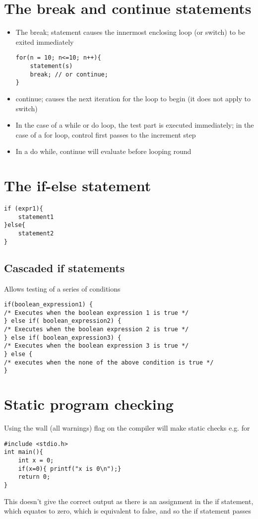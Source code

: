 \documentclass{article}[18pt]
\begin{document}
\section{The break and continue statements}
\begin{itemize}
	\item The break; statement causes the innermost enclosing loop (or switch) to be exited immediately
\begin{verbatim}
for(n = 10; n<=10; n++){
	statement(s)
	break; // or continue;
}
\end{verbatim}
	\item continue; causes the next iteration for the loop to begin (it does not apply to switch)
	\item In the case of a while or do loop, the test part is executed immediately; in the case of a for loop, control first passes to the increment step
	\item In a do while, continue will evaluate before looping round
\end{itemize}
\section{The if-else statement}
\begin{verbatim}
if (expr1){
	statement1
}else{
	statement2
}
\end{verbatim}
\subsection{Cascaded if statements}
Allows testing of a series of conditions
\begin{verbatim}
if(boolean_expression1) {
/* Executes when the boolean expression 1 is true */
} else if( boolean_expression2) {
/* Executes when the boolean expression 2 is true */
} else if( boolean_expression3) {
/* Executes when the boolean expression 3 is true */
} else {
/* executes when the none of the above condition is true */
}
\end{verbatim}
\section{Static program checking}
Using the wall (all warnings) flag on the compiler will make static checks e.g. for
\begin{verbatim}
#include <stdio.h>
int main(){
	int x = 0;
	if(x=0){ printf("x is 0\n");}
	return 0;
}
\end{verbatim}
This doesn't give the correct output as there is an assignment in the if statement, which equates to zero, which is equivalent to false, and so the if statement passes
\end{document}
